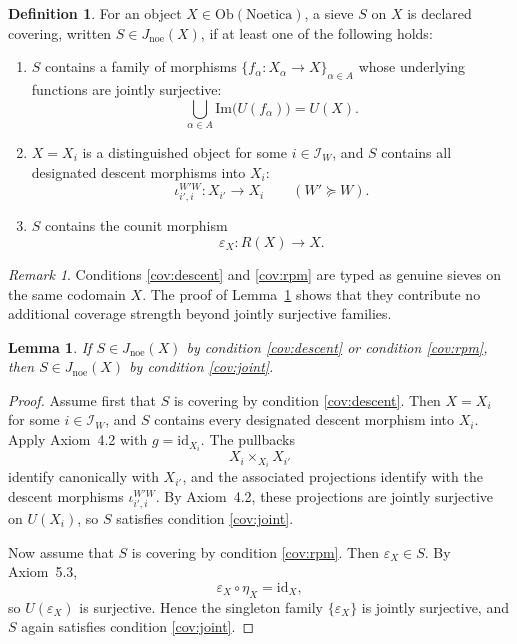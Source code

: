 \documentclass[11pt]{amsart}
\numberwithin{equation}{section}
\newtheorem{lemma}[theorem]{Lemma}
\theoremstyle{definition}
\newtheorem{definition}[theorem]{Definition}
\theoremstyle{remark}
\newtheorem{remark}[theorem]{Remark}
\newcommand{\Noetica}{\mathrm{Noetica}}
\newcommand{\id}{\mathrm{id}}
\newcommand{\I}{\mathcal{I}}
\newcommand{\Jnoe}{J_{\mathrm{noe}}}
\begin{document}
\begin{definition}
For an object \(X \in \mathrm{Ob}(\Noetica)\), a sieve \(S\) on \(X\) is declared covering, written \(S \in \Jnoe(X)\), if at least one of the following holds:
\begin{enumerate}[label=(\textnormal{Noe-Cov-\arabic*})]
\item \label{cov:joint} \(S\) contains a family of morphisms \(\{f_{\alpha} : X_{\alpha} \to X\}_{\alpha \in A}\) whose underlying functions are jointly surjective:
\[
\bigcup_{\alpha \in A}\mathrm{Im}\bigl(U(f_{\alpha})\bigr)=U(X).
\]
\item \label{cov:descent} \(X=X_i\) is a distinguished object for some \(i \in \I_W\), and \(S\) contains all designated descent morphisms into \(X_i\):
\[
\iota^{W'W}_{i',i} : X_{i'} \to X_i
\qquad
(W' \succeq W).
\]
\item \label{cov:rpm} \(S\) contains the counit morphism
\[
\varepsilon_X : R(X) \to X.
\]
\end{enumerate}
\end{definition}

\begin{remark}
Conditions \ref{cov:descent} and \ref{cov:rpm} are typed as genuine sieves on the same codomain \(X\). The proof of Lemma~\ref{lem:reduction} shows that they contribute no additional coverage strength beyond jointly surjective families.
\end{remark}

\begin{lemma}\label{lem:reduction}
If \(S \in \Jnoe(X)\) by condition \ref{cov:descent} or condition \ref{cov:rpm}, then \(S \in \Jnoe(X)\) by condition \ref{cov:joint}.
\end{lemma}

\begin{proof}
Assume first that \(S\) is covering by condition \ref{cov:descent}. Then \(X=X_i\) for some \(i \in \I_W\), and \(S\) contains every designated descent morphism into \(X_i\). Apply Axiom~4.2 with \(g=\id_{X_i}\). The pullbacks
\[
X_i \times_{X_i} X_{i'}
\]
identify canonically with \(X_{i'}\), and the associated projections identify with the descent morphisms \(\iota^{W'W}_{i',i}\). By Axiom~4.2, these projections are jointly surjective on \(U(X_i)\), so \(S\) satisfies condition \ref{cov:joint}.

Now assume that \(S\) is covering by condition \ref{cov:rpm}. Then \(\varepsilon_X \in S\). By Axiom~5.3,
\[
\varepsilon_X \circ \eta_X = \id_X,
\]
so \(U(\varepsilon_X)\) is surjective. Hence the singleton family \(\{\varepsilon_X\}\) is jointly surjective, and \(S\) again satisfies condition \ref{cov:joint}.
\end{proof}
\end{document}
